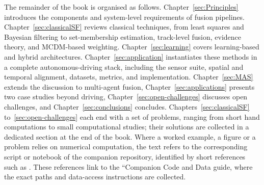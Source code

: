 The remainder of the book is organised as follows. Chapter~\ref{sec:Principles} introduces the components and system-level requirements of fusion pipelines. Chapter~\ref{sec:classicalSF} reviews classical techniques, from least squares and Bayesian filtering to set-membership estimation, track-level fusion, evidence theory, and MCDM-based weighting. Chapter~\ref{sec:learning} covers learning-based and hybrid architectures. Chapter~\ref{sec:application} instantiates these methods in a complete autonomous-driving stack, including the sensor suite, spatial and temporal alignment, datasets, metrics, and implementation. Chapter~\ref{sec:MAS} extends the discussion to multi-agent fusion, Chapter~\ref{sec:applications} presents two case studies beyond driving, Chapter~\ref{sec:open-challenges} discusses open challenges, and Chapter~\ref{sec:conclusions} concludes.
Chapters~\ref{sec:classicalSF} to~\ref{sec:open-challenges} each end with a set of problems, ranging from short hand computations to small computational studies; their solutions are collected in a dedicated section at the end of the book. Where a worked example, a figure or a problem relies on numerical computation, the text refers to the corresponding script or notebook of the companion repository, identified by short references such as . These references link to the ``Companion Code and Data guide, where the exact paths and data-access instructions are collected.

%
%
